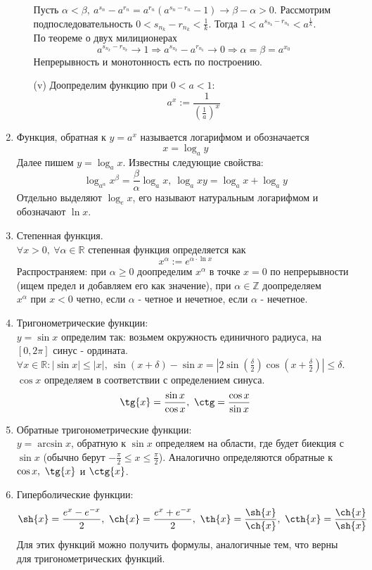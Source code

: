\documentclass[a4paper, 12pt]{article}
\newcommand{\Z}{\mathbb{Z}}
\newcommand{\R}{\mathbb{R}}
\theoremstyle{definition}
\begin{document}
\begin{enumerate}
\begin{itemize}
                Пусть $\alpha < \beta,\ a^{s_n}-a^{r_n}=a^{r_n}(a^{s_n-r_n}-1)\to \beta-\alpha>0$. Рассмотрим подпоследовательность $0<s_{n_k}-r_{n_k}<\frac{1}{k}$. Тогда $1<a^{s_{n_k}-r_{n_k}}<a^{\frac{1}{k}}$.\\
                По теореме о двух милиционерах \[a^{s_{n_k}-r_{n_k}}\to 1 \Rightarrow a^{s_{n_k}}-a^{r_{n_k}}\to 0 \Rightarrow \alpha=\beta=a^{x_0}\]
                Непрерывность и монотонность есть по построению.
                \item[(v)] Доопределим функцию при $0<a<1$:
                \[a^x:=\frac{1}{(\frac{1}{a})^x}\]
            \end{itemize}
            \item Функция, обратная к $y=a^x$ называется логарифмом и обозначается 
            \[x=\log_a{y}\]
            Далее пишем $y=\log_a{x}$. Известны следующие свойства:\\
            \[\log_{a^{\alpha}}{x^{\beta}}=\frac{\beta}{\alpha}\log_a{x},\ \log_a{xy}=\log_a{x}+\log_a{y}\]
            Отдельно выделяют $\log_e{x}$, его называют натуральным логарифмом и обозначают $\ln{x}$.
            \item Степенная функция.\\
            $\forall x>0,\ \forall \alpha\in\R$ степенная функция определяется как \[x^{\alpha}:=e^{\alpha\cdot \ln{x}}\]
            Распространяем: при $\alpha \geq 0$ доопределим $x^{\alpha}$ в точке $x=0$ по непрерывности (ищем предел и добавляем его как значение), при $\alpha\in \Z$ доопределяем\\
            $x^{\alpha}$ при $x<0$ четно, если $\alpha$ - четное и нечетное, если $\alpha$ - нечетное.
            \item Тригонометрические функции:\\ 
            $y=\sin{x}$ определим так: возьмем окружность единичного радиуса, на $[0,2\pi]$ синус - ордината.\\
            $\forall x\in\R: |\sin{x}|\leq |x|,\ \sin{(x+\delta)}-\sin{x}=|2\sin{(\frac{\delta}{2})}\cos{(x+\frac{\delta}{2})}|\leq \delta$.\\
            $\cos{x}$ определяем в соответствии с определением синуса.
            \[\tg{x}=\frac{\sin{x}}{\cos{x}},\ \ctg={\frac{\cos{x}}{\sin{x}}}\]
            \item Обратные тригонометрические функции:\\
            $y=\arcsin{x}$, обратную к $\sin{x}$ определяем на области, где будет биекция с $\sin{x}$ (обычно берут $-\frac{\pi}{2}\leq x\leq \frac{\pi}{2}$). Аналогично определяются обратные к $\cos{x},\ \tg{x}$ и $\ctg{x}$.
            \item Гиперболические функции:
            \[\sh{x}=\frac{e^x-e^{-x}}{2},\ \ch{x}=\frac{e^x+e^{-x}}{2},\ \th{x}=\frac{\sh{x}}{\ch{x}},\ \cth{x}=\frac{\ch{x}}{\sh{x}}\]
            Для этих функций можно получить формулы, аналогичные тем, что верны для тригонометрических функций.
        \end{enumerate}
\end{document}
